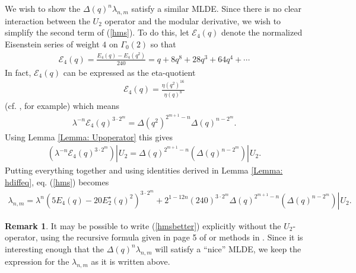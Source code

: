 \documentclass[10pt,a4paper]{amsart}
\numberwithin{equation}{section}
\theoremstyle{definition}
\newtheorem{Rem}[Th]{Remark}
\newcommand{\haupt}{\lambda}
\newcommand{\utwo}[1]{\left. #1 \right\rvert \hspace{1pt} U_{2}}
\begin{document}
We wish to show the $\Delta (q)^{n} \haupt_{n,m}$ satisfy a similar MLDE. Since there is no clear interaction between the $U_{2}$ operator and the modular derivative, we wish to simplify the second term of (\ref{hms}). To do this, let $\mathcal{E}_{4}(q)$ denote the normalized Eisenstein series of weight $4$ on $\Gamma_{0}(2)$ so that
\begin{align*}
    \mathcal{E}_{4}(q) = \frac{E_{4}(q) - E_{4}(q^{2})}{240} = q + 8q^{8} + 28q^{3} + 64 q^{4} + \cdots
\end{align*}
In fact, $\mathcal{E}_{4}(q)$ can be expressed as the eta-quotient
\begin{align*}
\mathcal{E}_{4}(q) = \frac{\eta (q^{2})^{16}}{\eta (q)^{8}}
\end{align*}
(cf. \cite{AZ19}, for example) which means
\begin{align*}
    \haupt^{-n} \mathcal{E}_{4}(q)^{3 \cdot 2^{m}} = \Delta (q^{2})^{2^{m+1}-n} \Delta (q)^{n-2^{m}}.
\end{align*}
Using Lemma \ref{Lemma: Upoperator} this gives
\begin{align*}
     \utwo{ \left( \haupt^{-n} \mathcal{E}_{4}(q)^{3 \cdot 2^{m}} \right) } = \Delta (q)^{2^{m+1}-n} \utwo{ \left( \Delta (q)^{n-2^{m}} \right) }.
\end{align*}
Putting everything together and using identities derived in Lemma \ref{Lemma: hdiffeq}, eq. (\ref{hms}) becomes
\begin{align}
    \haupt_{n,m} = \haupt^{n}  \left( 5E_{4}(q) - 20 E_{2}^{\star}(q)^{2} \right)^{3 \cdot 2^{m}} + 2^{1 - 12n} (240)^{3 \cdot 2^{m}} \Delta (q)^{2^{m+1}-n} \utwo{\left( \Delta (q)^{n-2^{m}} \right) }. \label{hmsbetter}
\end{align}
\begin{Rem}
    It may be possible to write (\ref{hmsbetter}) explicitly without the $U_{2}$-operator, using the recursive formula given in page 5 of \cite{BC05} or methods in \cite{D14}. Since it is interesting enough that the $\Delta (q)^{n} \haupt_{n,m}$ will satisfy a ``nice'' MLDE, we keep the expression for the $\haupt_{n,m}$ as it is written above.
\end{Rem}
\end{document}
